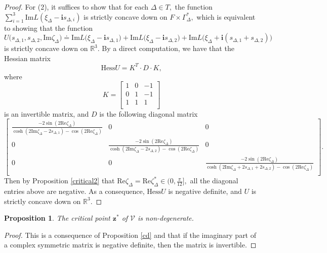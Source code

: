 \documentclass[11pt]{article}
\newtheorem{proposition}[theorem]{Proposition}
\theoremstyle{remark}
\theoremstyle{remark}
\numberwithin{equation}{section}
\begin{document}
\begin{proof}
For (2), it suffices to show that for each $\Delta\in T,$ the function $\sum_{i=1}^3\mathrm{Im}L(\xi_\Delta-\mathbf i s_{\Delta,i})$ is strictly concave down on $F \times \Gamma_\Delta^*,$ which is equivalent to showing that the function 
$$U\big(s_{\Delta,1},s_{\Delta,2},\mathrm{Im}\zeta_\Delta\big)\doteq \mathrm{Im}L\big(\xi_\Delta-\mathbf i s_{\Delta,1}\big)+\mathrm{Im}L\big(\xi_\Delta-\mathbf i s_{\Delta,2}\big)+\mathrm{Im}L\big(\xi_\Delta+\mathbf i (s_{\Delta,1}+s_{\Delta,2})\big)$$ is strictly concave down on $\mathbb R^3.$ By a direct computation, we have 
that the Hessian matrix  
$$\mathrm{Hess}U= K^T \cdot D \cdot K,$$
where 
$$K=\left[ \begin{matrix} 
    1 & 0 & -1 \\
    0 & 1 & -1 \\
    1 & 1 & 1 \\
\end{matrix}
\right] $$
is an invertible matrix, and $D$ is the following diagonal matrix
$$\left[ \begin{matrix} 
    \frac{-2\sin (2\mathrm{Re}\zeta_\Delta)}{\cosh (2\mathrm{Im}\zeta_\Delta-2s_{\Delta,1})-\cos (2\mathrm{Re}\zeta_\Delta)} & 0 & 0 \\
    0 &  \frac{-2\sin (2\mathrm{Re}\zeta_\Delta)}{\cosh (2\mathrm{Im}\zeta_\Delta-2s_{\Delta,2})-\cos (2\mathrm{Re}\zeta_\Delta)} & 0 \\
    0 & 0 &  \frac{-2\sin (2\mathrm{Re}\zeta_\Delta)}{\cosh (2\mathrm{Im}\zeta_\Delta+2s_{\Delta,1}+2s_{\Delta,2})-\cos (2\mathrm{Re}\zeta_\Delta)} \\
\end{matrix}
\right].$$
Then by Proposition \ref{critical2} that $\mathrm{Re}\zeta_\Delta = \mathrm{Re}\zeta_\Delta^*\in \big(0, \frac{\pi}{12}\big],$  all the diagonal entries above are negative. As a consequence, $\mathrm{Hess}U$ is negative definite, and $U$ is strictly concave down on $\mathbb R^3.$
\end{proof}




\begin{proposition}\label{nond}
The critical point  $\boldsymbol z^*$ of $\mathcal V$ is non-degenerate.
\end{proposition}

\begin{proof}
This is  a consequence of Proposition \ref{cd} and \cite{L} that if the imaginary part of a complex symmetric matrix is negative definite, then the matrix is invertible. 
\end{proof}
\end{document}
